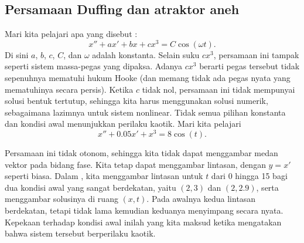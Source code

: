 \subsection{Persamaan Duffing dan atraktor aneh}

Mari kita pelajari apa yang disebut \emph{}:
\begin{equation*}
x'' + a x' + bx + cx^3 = C \cos(\omega t) .
\end{equation*}
Di sini $a$, $b$, $c$, $C$, dan $\omega$ adalah konstanta.
Selain suku $c x^3$, persamaan ini tampak seperti sistem massa-pegas yang
dipaksa.  Adanya $c x^3$ berarti pegas tersebut tidak sepenuhnya mematuhi
hukum Hooke (dan memang tidak ada pegas nyata yang mematuhinya secara persis).
Ketika $c$ tidak nol, persamaan ini tidak mempunyai solusi bentuk tertutup,
sehingga kita harus menggunakan solusi numerik, sebagaimana lazimnya untuk
sistem nonlinear.  Tidak semua pilihan konstanta dan kondisi awal menunjukkan
perilaku kaotik.  Mari kita pelajari
\begin{equation*}
x''+0.05 x' + x^3 = 8\cos(t) .
\end{equation*}

Persamaan ini tidak otonom, sehingga kita tidak dapat menggambar medan vektor
pada bidang fase.  Kita tetap dapat menggambar lintasan, dengan $y=x'$ seperti
biasa.  Dalam , kita menggambar lintasan untuk
$t$ dari 0 hingga 15 bagi dua kondisi awal yang sangat berdekatan, yaitu
$(2,3)$ dan $(2,2.9)$, serta menggambar solusinya di ruang $(x,t)$.  Pada
awalnya kedua lintasan berdekatan, tetapi tidak lama kemudian keduanya
menyimpang secara nyata.  Kepekaan terhadap kondisi awal inilah yang kita
maksud ketika mengatakan bahwa sistem tersebut berperilaku kaotik.

\begin{myfig}
\capstart
\caption{Di kiri, dua lintasan dalam ruang fase untuk $0 \leq t \leq 15$ bagi persamaan Duffing,
yang satu dengan kondisi awal $(2,3)$ dan yang lain dengan kondisi awal $(2,2.9)$.  Di
kanan, kedua solusi dalam ruang $(x,t)$. \label{nlin:duf-two-traj}}
\end{myfig}

